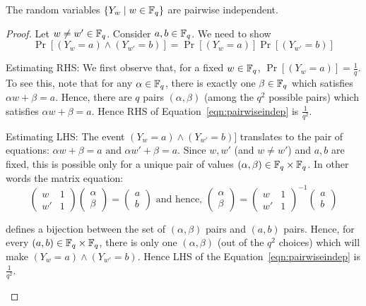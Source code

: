 \begin{claim}
The random variables $\{ Y_w \mid w \in {\mathbb{F}}_q\}$ are pairwise independent.
\end{claim}
\begin{proof}
Let $w \ne w' \in {\mathbb{F}}_q$. Consider $a,b \in {\mathbb{F}}_q$. We need to show 
\begin{equation}
\Pr\left[(Y_w = a) \land (Y_{w'} = b)\right] = \Pr\left[(Y_w = a)\right] \Pr \left[(Y_{w'} = b)\right]
\label{eqn:pairwiseindep}
\end{equation}

\begin{description}
\item{\sf Estimating RHS:}
We first observe that, for a fixed $w \in {\mathbb{F}}_q$, $\Pr\left[(Y_w = a)\right] = \frac{1}{q}$. To see this, note that for any $\alpha \in {\mathbb{F}}_q$, there is exactly one $\beta \in {\mathbb{F}}_q$ which satisfies $\alpha w + \beta = a$. Hence, there are $q$ pairs $(\alpha,\beta)$ (among the $q^2$ possible pairs) which satisfies $\alpha w+\beta = a$. Hence RHS of Equation~\ref{eqn:pairwiseindep} is $\frac{1}{q^2}$.
\item{\sf Estimating LHS:}
The event $(Y_w = a) \land (Y_{w'} = b)]$ translates to the pair of equations: $\alpha w + \beta = a \textrm{ and } \alpha w' + \beta = a$.
Since $w, w'$ (and $w \ne w'$) and $a,b$ are fixed, this is possible only for a unique pair of values $(\alpha, \beta) \in {\mathbb{F}}_q \times {\mathbb{F}}_q$. In other words the matrix equation:
\[
\begin{pmatrix}
w & 1 \\
w' & 1
\end{pmatrix}
\begin{pmatrix}
\alpha \\
\beta
\end{pmatrix}
=
\begin{pmatrix}
a \\
b
\end{pmatrix}
\textrm{ and hence, }
\begin{pmatrix}
\alpha \\
\beta
\end{pmatrix}
=
\begin{pmatrix}
w & 1 \\
w' & 1
\end{pmatrix}^{-1}
\begin{pmatrix}
a \\
b
\end{pmatrix}
\]

defines a bijection between the set of $(\alpha,\beta)$ pairs and $(a,b)$ pairs. Hence, for every $(a,b) \in {\mathbb{F}}_q \times {\mathbb{F}}_q$, there is only one $(\alpha,\beta)$ (out of the $q^2$ choices) which will make $(Y_w = a) \land (Y_{w'} = b)$. Hence LHS of the Equation~\ref{eqn:pairwiseindep} is $\frac{1}{q^2}$.
\end{description}
\end{proof}

